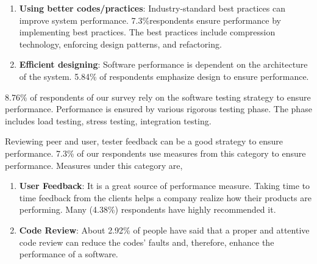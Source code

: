 \begin{enumerate}[label=(\alph*)]

    \item \textbf{Using better codes/practices}: Industry-standard best practices can improve system performance. 7.3\%respondents ensure performance by implementing best practices. The best practices include compression technology, enforcing design patterns, and refactoring.
    
    \item \textbf{Efficient designing}: Software performance is dependent on the architecture of the system. 5.84\% of respondents emphasize design to ensure performance.

\end{enumerate}

 8.76\% of respondents of our survey rely on the software testing strategy to ensure performance. Performance is ensured by various rigorous testing phase. The phase includes load testing, stress testing, integration testing.
 
 Reviewing peer and user, tester feedback can be a good strategy to ensure performance. 7.3\% of our respondents use measures from this category to ensure performance. Measures under this category are,
 
 \begin{enumerate}[label=(\alph*)]
 
     \item \textbf{User Feedback}: It is a great source of performance measure. Taking time to time feedback from the clients helps a company realize how their products are performing. Many (4.38\%) respondents have highly recommended it.
    
    \item \textbf{Code Review}: About 2.92\% of people have said that a proper and attentive code review can reduce the codes' faults and, therefore, enhance the performance of a software.
 
 \end{enumerate}



